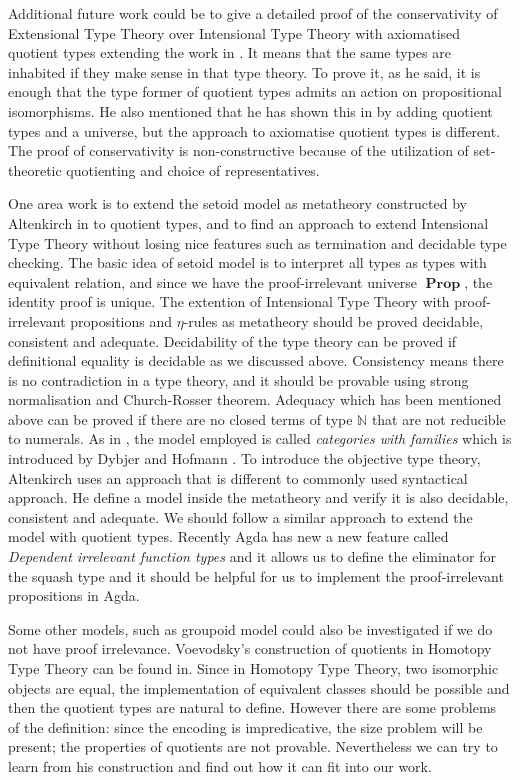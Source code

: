 \documentclass{article}
\theoremstyle{definition}
\newcommand{\N}{\mathbb{N}}
\DeclareMathOperator{\Prop}{\mathbf{Prop}}
\newcommand{\itt}{Intensional Type Theory}
\newcommand{\ett}{Extensional Type Theory}
\begin{document}
Additional future work could be to give a detailed proof of  the
conservativity of \ett{} over \itt{} with axiomatised quotient types extending the
work in \cite{hof:95:con}.  It means that the same types are inhabited
if they make sense in that type theory. To prove it, as he said, it is
enough that the type former of quotient types admits an action on
propositional isomorphisms. He also mentioned that he has shown this
in \cite{hof:phd} by adding quotient types and a universe, but the approach
to axiomatise quotient types is different. The proof of conservativity
is non-constructive because of the utilization of set-theoretic
quotienting and choice of representatives.

One area work is to extend the setoid model as metatheory
constructed by Altenkirch in \cite{alt:99} to
quotient types, and to find an approach to extend \itt{} without losing
nice features such as termination and decidable type
checking.
The basic idea of setoid model is to interpret all types as types with
equivalent relation, and since we have the proof-irrelevant universe
$\Prop$, the identity proof is unique. 
The extention of \itt{} with proof-irrelevant propositions and
$\eta$-rules as metatheory should be proved decidable, consistent and
adequate. Decidability of the type theory can be proved if definitional equality is decidable as we discussed
above. 
Consistency means there is no contradiction in a type theory, and it
should be provable using strong normalisation and Church-Rosser
theorem. 
Adequacy which has been mentioned above can be proved if there are no closed terms of type
$\N$ that are not reducible to numerals. 
As in \cite{alt:99}, the model employed is called \emph{categories with families} which
is introduced by Dybjer and Hofmann \cite{dyb:96,hof:97}.
To introduce the objective type theory, Altenkirch uses
an approach that is different to commonly used syntactical
approach. He define a model inside the metatheory and verify 
it is also decidable, consistent and adequate. We should follow a
similar approach to extend the model with quotient types. Recently
Agda has new a new feature called \emph{Dependent irrelevant function
  types} and it allows us to define the eliminator for the squash type
and it should be helpful for us to implement the proof-irrelevant
propositions in Agda.



Some other models, such as groupoid model
could also be investigated if we do not have proof irrelevance.
Voevodsky's construction of quotients in Homotopy Type
Theory can be found in\cite{voe:hset}. Since in Homotopy Type Theory,
two isomorphic objects are equal, the implementation of equivalent
classes should be possible and then the quotient types are natural to define.
However there are some problems of the definition: since 
the encoding is impredicative, the size problem will be present; the
properties of quotients are not provable. Nevertheless we can try to learn
from his construction and find out how it can fit into our work.
\end{document}
